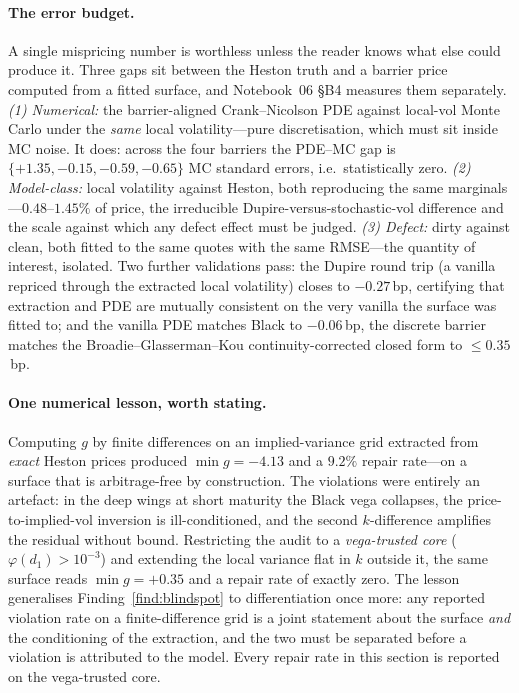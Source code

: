 \paragraph{The error budget.} A single mispricing number is worthless unless the reader knows
what else could produce it. Three gaps sit between the Heston truth and a barrier price
computed from a fitted surface, and Notebook~06 \S B4 measures them separately. \emph{(1)
Numerical:} the barrier-aligned Crank--Nicolson PDE against local-vol Monte Carlo under the
\emph{same} local volatility---pure discretisation, which must sit inside MC noise. It does:
across the four barriers the PDE--MC gap is $\{+1.35,-0.15,-0.59,-0.65\}$ MC standard errors,
i.e.\ statistically zero. \emph{(2) Model-class:} local volatility against Heston, both
reproducing the same marginals---$0.48$--$1.45\%$ of price, the irreducible
Dupire-versus-stochastic-vol difference and the scale against which any defect effect must be
judged. \emph{(3) Defect:} dirty against clean, both fitted to the same quotes with the same
RMSE---the quantity of interest, isolated. Two further validations pass: the Dupire round trip
(a vanilla repriced through the extracted local volatility) closes to $-0.27$\,bp,
certifying that extraction and PDE are mutually consistent on the very vanilla the surface was
fitted to; and the vanilla PDE matches Black to $-0.06$\,bp, the discrete barrier
matches the Broadie--Glasserman--Kou continuity-corrected closed form to $\le0.35$\,bp.

\paragraph{One numerical lesson, worth stating.} Computing $g$ by finite differences on an
implied-variance grid extracted from \emph{exact} Heston prices produced $\min g=-4.13$ and a
$9.2\%$ repair rate---on a surface that is arbitrage-free by construction. The violations were
entirely an artefact: in the deep wings at short maturity the Black vega collapses, the
price-to-implied-vol inversion is ill-conditioned, and the second $k$-difference amplifies the
residual without bound. Restricting the audit to a \emph{vega-trusted core}
($\varphi(d_1)>10^{-3}$) and extending the local variance flat in $k$ outside it, the same
surface reads $\min g=+0.35$ and a repair rate of exactly zero. The lesson generalises
Finding~\ref{find:blindspot} to differentiation once more: any reported violation rate on a
finite-difference grid is a joint statement about the surface \emph{and} the conditioning of
the extraction, and the two must be separated before a violation is attributed to the model.
Every repair rate in this section is reported on the vega-trusted core.

